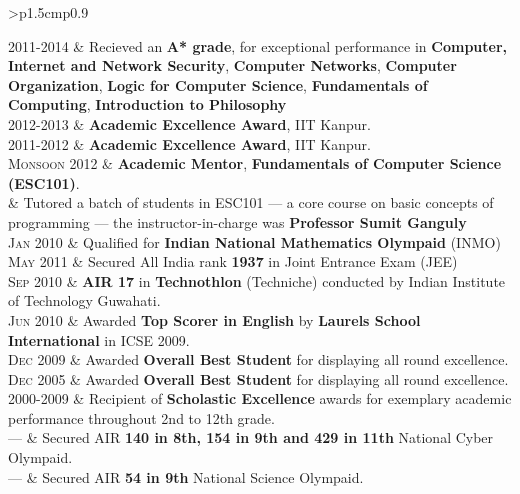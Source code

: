 \documentclass[a4paper,10pt]{article} %
\newcommand{\itemlist}[1]{
    \begin{tabular}{>{\raggedleft}p{1.5cm}p{0.9\linewidth}}
        #1
    \end{tabular}
}
\begin{document}
\itemlist {
    \textsc{2011-2014}   & Recieved an \textbf{A* grade}, for exceptional performance in
                            \textbf{Computer, Internet and Network Security},
                            \textbf{Computer Networks},
                            \textbf{Computer Organization},
                            \textbf{Logic for Computer Science},
                            \textbf{Fundamentals of Computing},
                            \textbf{Introduction to Philosophy} \\
    \textsc{2012-2013}   & \textbf{Academic Excellence Award}, IIT Kanpur. \\
    \textsc{2011-2012}   & \textbf{Academic Excellence Award}, IIT Kanpur. \\
    \textsc{Monsoon 2012}   & \textbf{Academic Mentor}, \textbf{Fundamentals of Computer Science (ESC101)}. \\
                         & \footnotesize{Tutored a batch of students in ESC101 --- a core course on
                            basic concepts of programming --- the instructor-in-charge was \textbf{Professor
                            Sumit Ganguly}}\\
    \textsc{Jan 2010}    & Qualified for \textbf{Indian National Mathematics Olympaid} (INMO) \\
    \textsc{May 2011}    & Secured All India rank \textbf{1937} in Joint Entrance Exam (JEE) \\
    \textsc{Sep 2010}    & \textbf{AIR 17} in \textbf{Technothlon} (Techniche) conducted by Indian Institute of Technology Guwahati. \\
    \textsc{Jun 2010}   & Awarded \textbf{Top Scorer in English} by \textbf{Laurels School International} in ICSE 2009. \\
    \textsc{Dec 2009}    & Awarded \textbf{Overall Best Student} for displaying all round excellence. \\
    \textsc{Dec 2005}    & Awarded \textbf{Overall Best Student} for displaying all round excellence. \\
    \textsc{2000-2009} & Recipient of \textbf{Scholastic Excellence} awards for exemplary academic
                           performance throughout 2nd to 12th grade. \\
    \textsc{---} & Secured AIR \textbf{140 in 8th, 154 in 9th and 429 in 11th} National Cyber Olympaid.\\
    \textsc{---} & Secured AIR \textbf{54 in 9th} National Science Olympaid.\\
}
\end{document}
